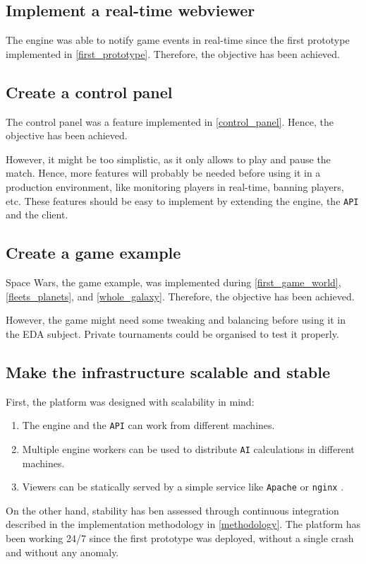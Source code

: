 \documentclass[a4paper,11pt,titlepage,abstract,numbers=noenddot,automark,mnsy,intlimits,rgb,dvipsnames]{report}
\begin{document}
\subsection{Implement a real-time webviewer}
The engine was able to notify game events in real-time since the first prototype implemented in
\autoref{first_prototype}. Therefore, the objective has been achieved.
\subsection{Create a control panel}
The control panel was a feature implemented in \autoref{control_panel}. Hence, the objective has been achieved.

However, it might be too simplistic, as it only allows to play and pause the match.
Hence, more features will probably be needed before using it in a production environment, like
monitoring players in real-time, banning players, etc. These features should be easy to implement by
extending the engine, the \texttt{API} and the client.
\subsection{Create a game example}
Space Wars, the game example, was implemented during \autoref{first_game_world}, \autoref{fleets_planets},
and \autoref{whole_galaxy}. Therefore, the objective has been achieved.

However, the game might need some tweaking and balancing before using it in the EDA subject. Private tournaments could
be organised to test it properly.
\subsection{Make the infrastructure scalable and stable}
First, the platform was designed with scalability in mind:
\begin{enumerate}
\item
The engine and the \texttt{API} can work from different machines.
\item
Multiple engine workers can be used to distribute \texttt{AI} calculations in different machines.
\item
Viewers can be statically served by a simple service like \texttt{Apache} \cite{apache} or \texttt{nginx} \cite{nginx}.
\end{enumerate}

On the other hand, stability has ben assessed through continuous integration described in the implementation
methodology in \autoref{methodology}. The platform has been working 24/7 since the first prototype was deployed, without
a single crash and without any anomaly.
\end{document}
